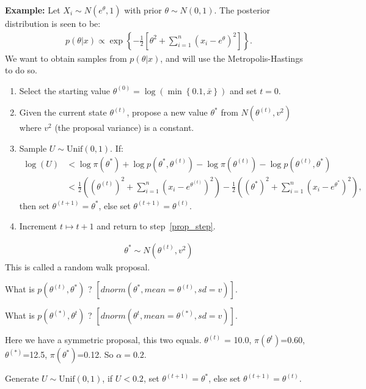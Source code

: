 \documentclass[11pt]{article}
\begin{document}
\begin{itemize}
\begin{itemize}
    \textbf{Example:} Let $X_{i}\sim{}N(e^{\theta},1)$ with prior $\theta\sim{}N(0,1)$. The posterior distribution is seen to be:
	\begin{align*}
	p(\theta|x) \propto \exp\left\{-\frac{1}{2}\left[\theta^{2}+\sum_{i=1}^{n}\left(x_{i}-e^{\theta}\right)^{2}\right]\right\} . 
	\end{align*} 
	We want to obtain samples from $p(\theta|x)$, and will use the Metropolis-Hastings to do so. 
	\begin{enumerate}
    \item Select the starting value $\theta^{(0)}=\log\left(\min\left\{0.1,\bar{x}\right\}\right)$ and set $t=0$.
    \item\label{prop_step} Given the current state $\theta^{(t)}$, propose a new value $\theta^{*}$ from $N(\theta^{(t)},v^{2})$ where $v^{2}$ (the proposal variance) is a constant. 
    \item Sample $U\sim{}\textrm{Unif}(0,1)$. If:
    \begin{align*}
    \log(U) &<  \log\pi(\theta^{*}) + \log{}p(\theta^{*},\theta^{(t)}) - \log{}\pi(\theta^{(t)}) - \log{}p(\theta^{(t)},\theta^{*})  \\
     &< \frac{1}{2}\left((\theta^{(t)})^{2}+\sum_{i=1}^{n}(x_{i}-e^{\theta^{(t)}})^{2}\right) - \frac{1}{2}\left((\theta^{*})^{2}+\sum_{i=1}^{n}(x_{i}-e^{\theta^{*}})^{2}\right) ,
    \end{align*}
    then set $\theta^{(t+1)}=\theta^{*}$, else set $\theta^{(t+1)}=\theta^{(t)}$. 
    \item Increment $t\mapsto{}t+1$ and return to step~\ref{prop_step}. 
    \end{enumerate}
        \begin{align*}
        \theta^{*} \sim N(\theta^{(t)},v^{2})   
        \end{align*}
        This is called a random walk proposal. \par 
        What is $p(\theta^{(t)},\theta^{*})$ ? $[dnorm(\theta^{*},mean=\theta^{(t)},sd=v)]$.\par 
        What is $p(\theta^{(*)},\theta^{t})$ ? $[dnorm(\theta^{t},mean=\theta^{(*)},sd=v)]$. 
        \par Here we have a symmetric proposal, this two equals.
        $\theta^{(t)}$ = 10.0, $\pi(\theta^{t})$=0.60,
        $\theta^{(*)}$=12.5, $\pi(\theta^{*})$=0.12.
        So $\alpha=0.2$. \par
        Generate  $U\sim{}\textrm{Unif}(0,1)$, if $U<0.2$, set $\theta^{(t+1)}=\theta^{*}$, else set $\theta^{(t+1)}=\theta^{(t)}$. \par

\end{itemize}
\end{itemize}
\end{document}
